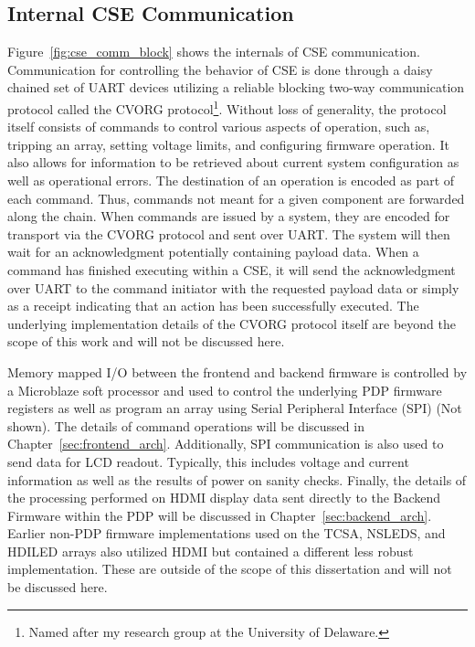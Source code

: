     \subsection{Internal CSE Communication}
        Figure~\ref{fig:cse_comm_block} shows the internals of CSE communication. Communication for controlling the behavior of CSE is done through a daisy chained set of UART devices utilizing a reliable blocking two-way communication protocol called the CVORG protocol\footnote{Named after my research group at the University of Delaware.}. Without loss of generality, the protocol itself consists of commands to control various aspects of operation, such as, tripping an array, setting voltage limits, and configuring firmware operation. It also allows for information to be retrieved about current system configuration as well as operational errors. The destination of an operation is encoded as part of each command. Thus, commands not meant for a given component are forwarded along the chain. When commands are issued by a system, they are encoded for transport via the CVORG protocol and sent over UART. The system will then wait for an acknowledgment potentially containing payload data. When a command has finished executing within a CSE, it will send the acknowledgment over UART to the command initiator with the requested payload data or simply as a receipt indicating that an action has been successfully executed. The underlying implementation details of the CVORG protocol itself are beyond the scope of this work and will not be discussed here.

        Memory mapped I/O between the frontend and backend firmware is controlled by a Microblaze soft processor and used to control the underlying PDP firmware registers as well as program an array using Serial Peripheral Interface (SPI) (Not shown). The details of command operations will be discussed in Chapter~\ref{sec:frontend_arch}. Additionally, SPI communication is also used to send data for LCD readout. Typically, this includes voltage and current information as well as the results of power on sanity checks. Finally, the details of the processing performed on HDMI display data sent directly to the Backend Firmware within the PDP will be discussed in Chapter~\ref{sec:backend_arch}. Earlier non-PDP firmware implementations used on the TCSA, NSLEDS, and HDILED arrays also utilized HDMI but contained a different less robust implementation. These are outside of the scope of this dissertation and will not be discussed here.

